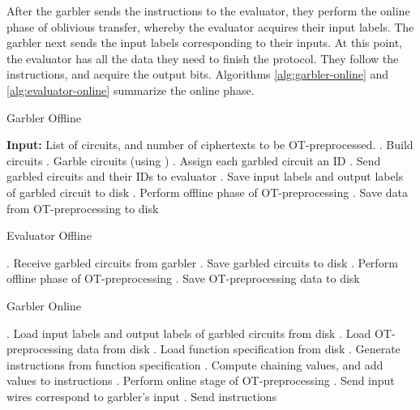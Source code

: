 After the garbler sends the instructions to the evaluator, they perform the online phase of oblivious transfer, whereby the evaluator acquires their input labels. 
The garbler next sends the input labels corresponding to their inputs. 
At this point, the evaluator has all the data they need to finish the protocol. 
They follow the instructions, and acquire the output bits. 
Algorithms \ref{alg:garbler-online} and \ref{alg:evaluator-online} summarize the online phase. 

\begin{algorithm}
    \caption{Garbler Offline}
    \label{alg:garbler-offline}
    \begin{algorithmic}
        \State \textbf{Input:} List of circuits, and number of ciphertexts to be OT-preprocessed.
        . Build circuits
        . Garble circuits (using \LibGarble)
        . Assign each garbled circuit an ID
        . Send garbled circuits and their IDs to evaluator
        . Save input labels and output labels of garbled circuit to disk
        . Perform offline phase of OT-preprocessing
        . Save data from OT-preprocessing to disk
    \end{algorithmic}
\end{algorithm}

\begin{algorithm}
    \caption{Evaluator Offline}
    \label{alg:evaluator-offline}
    \begin{algorithmic}
        . Receive garbled circuits from garbler
        . Save garbled circuits to disk
        . Perform offline phase of OT-preprocessing
        . Save OT-preprocessing data to disk
    \end{algorithmic}
\end{algorithm}

\begin{algorithm}
    \caption{Garbler Online}
    \label{alg:garbler-online}
    \begin{algorithmic}
        . Load input labels and output labels of garbled circuits from disk
        . Load OT-preprocessing data from disk
        . Load function specification from disk
        . Generate instructions from function specification
        . Compute chaining values, and add values to instructions
        . Perform online stage of OT-preprocessing
        . Send input wires correspond to garbler's input
        . Send instructions
    \end{algorithmic}
\end{algorithm}

